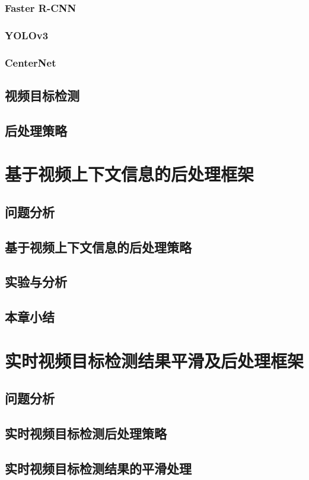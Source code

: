 \documentclass[winfonts,master,twoside,AutoFakeBold= {2}]{njuthesis}
\begin{document}
\subsection{Faster R-CNN}
\subsection{YOLOv3}
\subsection{CenterNet}
\section{视频目标检测}

\section{后处理策略}

\chapter{基于视频上下文信息的后处理框架}
\section{问题分析}
\section{基于视频上下文信息的后处理策略}
\section{实验与分析}
\section{本章小结}

\chapter{实时视频目标检测结果平滑及后处理框架}
\section{问题分析}
\section{实时视频目标检测后处理策略}
\section{实时视频目标检测结果的平滑处理}
\end{document}

